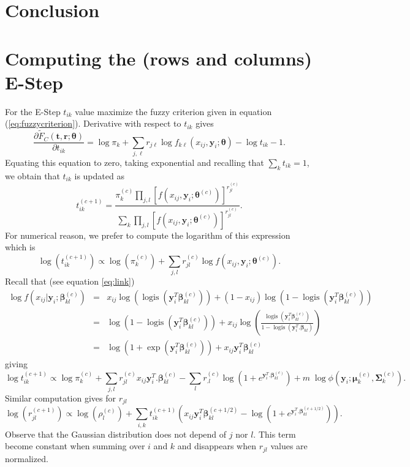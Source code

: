 \documentclass[a4paper]{article}
\DeclareMathOperator{\logis}{logis}
\newcommand{\br}{\mathbf{r}}
\newcommand{\bt}{\mathbf{t}}
\newcommand{\by}{\mathbf{y}}
\newcommand{\bbeta}{\boldsymbol{\beta}}
\newcommand{\bmu}{\boldsymbol{\mu}}
\newcommand{\bSigma}{\boldsymbol{\Sigma}}
\newcommand{\btheta}{\boldsymbol{\theta}}
\begin{document}
{ 
 
 
 
 
 
 
 
 
 
 















  
  
\section{Conclusion}\label{sec:conclusion}




\appendix
\section{Computing the (rows and columns) E-Step}
\label{app:EStep}
For the E-Step $t_{ik}$ value maximize the fuzzy criterion
given in equation (\ref{eq:fuzzycriterion}). Derivative with
respect to $t_{ik}$ gives
$$
\frac{\partial\tilde{F}_C(\bt,\br;\btheta)}{\partial t_{ik}} = \log\pi_k + \sum_{j,\ell} r_{j\ell} \log f_{k\ell}(x_{ij},\by_i;\btheta) - \log t_{ik} - 1.
$$
Equating this equation to zero, taking exponential and recalling that
$\sum_k t_{ik} = 1$, we obtain that $t_{ik}$ is updated as  
$$t_{ik}^{(c+1)}=\frac{\pi_{k}^{(c)}  \prod_{j,l}  \left[  f(x_{ij},\by_i;\btheta^{(c)})\right]^{r_{jl}^{(c)}}  }{ \sum_{k}\prod_{j,l}  \left[  f(x_{ij},\by_i;\btheta^{(c)})\right]^{r_{jl}^{(c)}}}.
$$
For numerical reason, we prefer to compute the logarithm of this expression which is
$$\log(t_{ik}^{(c+1)}) \propto \log(\pi_{k}^{(c)}) + \sum_{j,l} r_{jl}^{(c)} \log f(x_{ij},\by_i;\btheta^{(c)} ). $$
Recall that (see equation \ref{eq:link})
\begin{eqnarray*}
   \log f(x_{ij}|\by_i;\bbeta_{kl}^{(c)}) & = & x_{ij}\log(\logis(\by_{i}^{T}\bbeta_{kl}^{(c)}))
+ 
(1-x_{ij})\log(1-\logis(\by_{i}^{T}\bbeta_{kl}^{(c)})) \\
   & = & \log(1-\logis(\by_{i}^{T}\bbeta_{kl}^{(c)})) + x_{ij}\log\left(\frac{\logis(\by_{i}^{T}\bbeta_{kl}^{(c)})}{1-\logis(\by_{i}^{T}.\bbeta_{kl})}\right) \\
   & = & \log(1+\exp(\by_{i}^{T}\bbeta_{kl}^{(c)})) + x_{ij} \by_i^T\bbeta_{kl}^{(c)}
\end{eqnarray*}
giving
$$
\log t_{ik}^{(c+1)} \propto \log \pi_{k}^{(c)} + \sum_{j,l} r_{jl}^{(c)} x_{ij} \by_i^T.\bbeta_{kl}^{(c)}
- \sum_{l} r_{.l}^{(c)} \log(1+e^{\by_i^T.\bbeta_{kl}^{(c)}}) + m\;\log\phi(\by_i;\bmu_k^{(c)},\bSigma_k^{(c)}).
$$
Similar computation gives for $r_{jl}$
$$
\log(r_{jl}^{(c+1)}) \propto \log\left(\rho_{l}^{(c)}\right)
+ \sum_{i,k} t_{ik}^{(c+1)} \left( x_{ij} \by_i^T\bbeta_{kl}^{(c+1/2)} - 
\log\left(1+e^{\by_i^T.\bbeta_{kl}^{(c+1/2)}}\right) \right).
$$
Observe that the Gaussian distribution does not depend of $j$ nor $l$.
This term become constant when summing over $i$ and $k$ and disappears
when $r_{jl}$ values are normalized.

}
\end{document}
